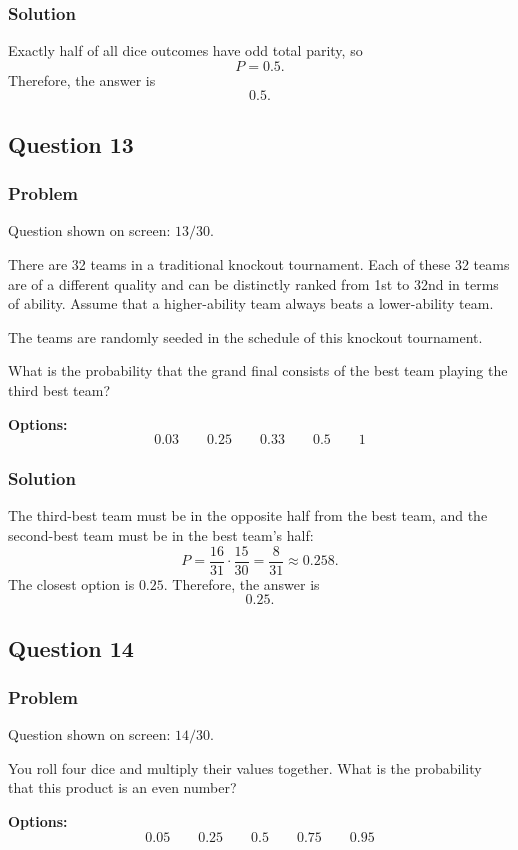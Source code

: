 \documentclass[12pt]{article}
\begin{document}
\subsubsection{Solution}
Exactly half of all dice outcomes have odd total parity, so
\[
P=0.5.
\]
Therefore, the answer is
\[
\boxed{0.5}.
\]

\subsection{Question 13}
\subsubsection{Problem}
Question shown on screen: \(13/30\).

There are 32 teams in a traditional knockout tournament. Each of these 32 teams are of a different quality and can be distinctly ranked from 1st to 32nd in terms of ability. Assume that a higher-ability team always beats a lower-ability team.

The teams are randomly seeded in the schedule of this knockout tournament.

What is the probability that the grand final consists of the best team playing the third best team?

\noindent\textbf{Options:}
\[
\boxed{0.03}
\qquad
\boxed{0.25}
\qquad
\boxed{0.33}
\qquad
\boxed{0.5}
\qquad
\boxed{1}
\]

\subsubsection{Solution}
The third-best team must be in the opposite half from the best team, and the second-best team must be in the best team's half:
\[
P=\frac{16}{31}\cdot \frac{15}{30}
=\frac{8}{31}\approx 0.258.
\]
The closest option is \(0.25\). Therefore, the answer is
\[
\boxed{0.25}.
\]

\subsection{Question 14}
\subsubsection{Problem}
Question shown on screen: \(14/30\).

You roll four dice and multiply their values together. What is the probability that this product is an even number?

\noindent\textbf{Options:}
\[
\boxed{0.05}
\qquad
\boxed{0.25}
\qquad
\boxed{0.5}
\qquad
\boxed{0.75}
\qquad
\boxed{0.95}
\]
\end{document}

